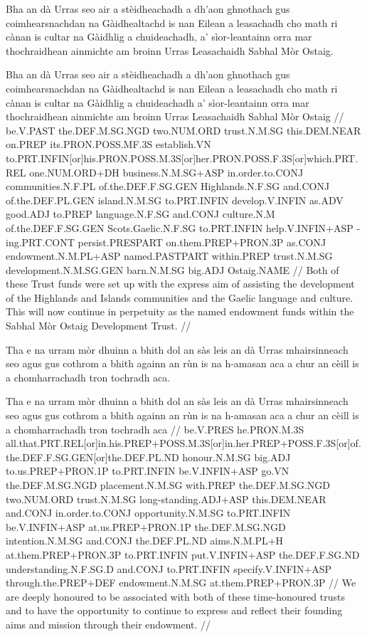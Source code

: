 \documentclass[a4paper,10pt]{article}
\begin{document}
\ex
\begingl
\glpre Bha an dà Urras seo air a stèidheachadh a dh'aon ghnothach gus coimhearsnachdan na Gàidhealtachd is nan Eilean a leasachadh cho math ri cànan is cultar na Gàidhlig a chuideachadh, a' sìor-leantainn orra mar thochraidhean ainmichte am broinn Urras Leasachaidh Sabhal Mòr Ostaig. 

\vspace{4mm}
\gla Bha an dà Urras seo air a stèidheachadh a dh'aon ghnothach gus coimhearsnachdan na Gàidhealtachd is nan Eilean a leasachadh cho math ri cànan is cultar na Gàidhlig a chuideachadh a' sìor-leantainn orra mar thochraidhean ainmichte {am broinn} Urras Leasachaidh Sabhal Mòr Ostaig  //
\glb be.V.PAST the.DEF.M.SG.NGD two.NUM.ORD trust.N.M.SG this.DEM.NEAR on.PREP its.PRON.POSS.MF.3S establish.VN to.PRT.INFIN[or]his.PRON.POSS.M.3S[or]her.PRON.POSS.F.3S[or]which.PRT.REL one.NUM.ORD+DH business.N.M.SG+ASP in.order.to.CONJ communities.N.F.PL of.the.DEF.F.SG.GEN Highlands.N.F.SG and.CONJ of.the.DEF.PL.GEN island.N.M.SG to.PRT.INFIN develop.V.INFIN as.ADV good.ADJ to.PREP language.N.F.SG and.CONJ culture.N.M of.the.DEF.F.SG.GEN Scots.Gaelic.N.F.SG to.PRT.INFIN help.V.INFIN+ASP -ing.PRT.CONT persist.PRESPART on.them.PREP+PRON.3P as.CONJ endowment.N.M.PL+ASP named.PASTPART within.PREP trust.N.M.SG development.N.M.SG.GEN barn.N.M.SG big.ADJ Ostaig.NAME  //
\glft Both of these Trust funds were set up with the express aim of assisting the development of the Highlands and Islands communities and the Gaelic language and culture. This will now continue in perpetuity as the named endowment funds within the Sabhal Mòr Ostaig Development Trust. //
\endgl
\xe

\ex
\begingl
\glpre Tha e na urram mòr dhuinn a bhith dol an sàs leis an dà Urras mhairsinneach seo agus gus cothrom a bhith againn an rùn is na h-amasan aca a chur an cèill is a chomharrachadh tron tochradh aca. 

\vspace{4mm}
\gla Tha e na urram mòr dhuinn a bhith dol an sàs leis an dà Urras mhairsinneach seo agus gus cothrom a bhith againn an rùn is na h-amasan aca a chur an cèill is a chomharrachadh tron tochradh aca  //
\glb be.V.PRES he.PRON.M.3S all.that.PRT.REL[or]in.his.PREP+POSS.M.3S[or]in.her.PREP+POSS.F.3S[or]of.the.DEF.F.SG.GEN[or]the.DEF.PL.ND honour.N.M.SG big.ADJ to.us.PREP+PRON.1P to.PRT.INFIN be.V.INFIN+ASP go.VN the.DEF.M.SG.NGD placement.N.M.SG with.PREP the.DEF.M.SG.NGD two.NUM.ORD trust.N.M.SG long-standing.ADJ+ASP this.DEM.NEAR and.CONJ in.order.to.CONJ opportunity.N.M.SG to.PRT.INFIN be.V.INFIN+ASP at.us.PREP+PRON.1P the.DEF.M.SG.NGD intention.N.M.SG and.CONJ the.DEF.PL.ND aims.N.M.PL+H at.them.PREP+PRON.3P to.PRT.INFIN put.V.INFIN+ASP the.DEF.F.SG.ND understanding.N.F.SG.D and.CONJ to.PRT.INFIN specify.V.INFIN+ASP through.the.PREP+DEF endowment.N.M.SG at.them.PREP+PRON.3P  //
\glft We are deeply honoured to be associated with both of these time-honoured trusts and to have the opportunity to continue to express and reflect their founding aims and mission through their endowment. //
\endgl
\xe
\end{document}
